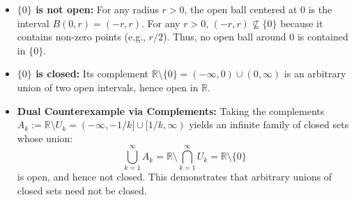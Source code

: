 \begin{content}

\begin{steps}
\begin{itemize}
    \item \textbf{$\{0\}$ is not open:} For any radius $r > 0$, the open ball centered at $0$ is the interval $B(0, r) = (-r, r)$. For any $r > 0$, $(-r, r) \not\subseteq \{0\}$ because it contains non-zero points (e.g., $r/2$). Thus, no open ball around $0$ is contained in $\{0\}$.
    \item \textbf{$\{0\}$ is closed:} Its complement $\mathbb{R} \setminus \{0\} = (-\infty, 0) \cup (0, \infty)$ is an arbitrary union of two open intervals, hence open in $\mathbb{R}$.
    \item \textbf{Dual Counterexample via Complements:} Taking the complements $A_k := \mathbb{R} \setminus U_k = (-\infty, -1/k] \cup [1/k, \infty)$ yields an infinite family of closed sets whose union:
    \[
    \bigcup_{k=1}^\infty A_k = \mathbb{R} \setminus \bigcap_{k=1}^\infty U_k = \mathbb{R} \setminus \{0\}
    \]
    is open, and hence not closed. This demonstrates that arbitrary unions of closed sets need not be closed.
\end{itemize}
\end{steps}
\end{content}

\begin{hidden}
\end{hidden}

